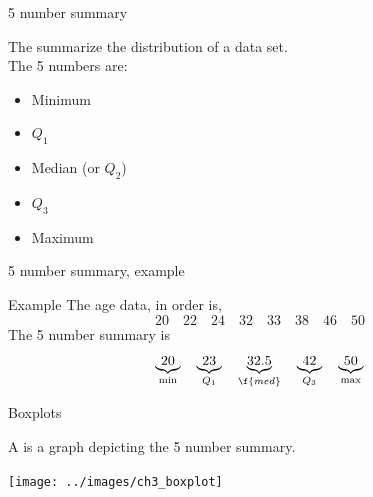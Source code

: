 \documentclass[xcolor=table, handout]{beamer}
\begin{document}
\begin{frame}{5 number summary}
\begin{block}{}
The  summarize the distribution of a data set.\\
\medskip
The 5 numbers are:
\begin{itemize}
\item Minimum
\item $Q_1$
\item Median (or $Q_2$)
\item $Q_3$
\item Maximum
\end{itemize}
\end{block}
\end{frame}

\begin{frame}{5 number summary, example}
\begin{exampleblock}{Example}
The age data, in order is, 
\[20 \quad 22 \quad 24 \quad 32 \quad 33 \quad 38 \quad 46 \quad 50 \]
The 5 number summary is
\[\underbrace{20}_{\min} \quad \underbrace{23}_{Q_1} \quad \underbrace{32.5}_{\f{med}} \quad \underbrace{42}_{Q_3} \quad \underbrace{50}_{\max}\]
\end{exampleblock}
\end{frame}

\begin{frame}{Boxplots}
\begin{block}{}
A  is a graph depicting the 5 number summary.

\end{block}
{\centering
\texttt{[image: ../images/ch3\_boxplot]}\par
}
\end{frame}
\end{document}
